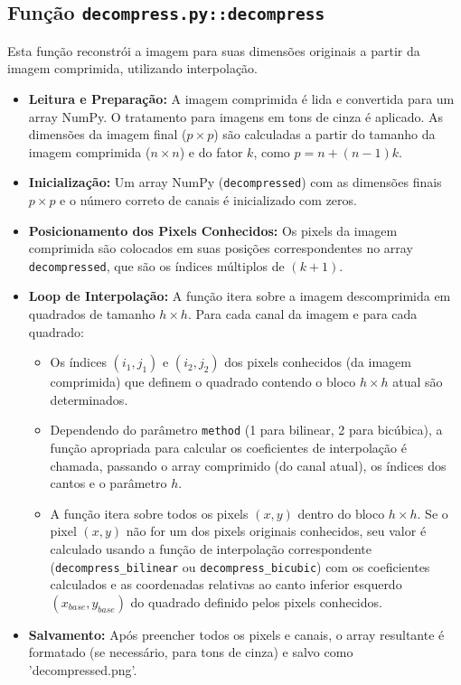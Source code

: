 \documentclass[12pt, a4paper]{article}
\begin{document}
\subsection{Função \texttt{decompress.py::decompress}}
Esta função reconstrói a imagem para suas dimensões originais a partir da imagem comprimida, utilizando interpolação.
\begin{itemize}
    \item \textbf{Leitura e Preparação:} A imagem comprimida é lida e convertida para um array NumPy. O tratamento para imagens em tons de cinza é aplicado. As dimensões da imagem final ($p \times p$) são calculadas a partir do tamanho da imagem comprimida ($n \times n$) e do fator $k$, como $p = n + (n-1)k$.
    \item \textbf{Inicialização:} Um array NumPy (\texttt{decompressed}) com as dimensões finais $p \times p$ e o número correto de canais é inicializado com zeros.
    \item \textbf{Posicionamento dos Pixels Conhecidos:} Os pixels da imagem comprimida são colocados em suas posições correspondentes no array \texttt{decompressed}, que são os índices múltiplos de $(k+1)$.
    \item \textbf{Loop de Interpolação:} A função itera sobre a imagem descomprimida em quadrados de tamanho $h \times h$. Para cada canal da imagem e para cada quadrado:
        \begin{itemize}
            \item Os índices $(i_1, j_1)$ e $(i_2, j_2)$ dos pixels conhecidos (da imagem comprimida) que definem o quadrado contendo o bloco $h \times h$ atual são determinados.
            \item Dependendo do parâmetro \texttt{method} (1 para bilinear, 2 para bicúbica), a função apropriada para calcular os coeficientes de interpolação é chamada, passando o array comprimido (do canal atual), os índices dos cantos e o parâmetro $h$.
            \item A função itera sobre todos os pixels $(x, y)$ dentro do bloco $h \times h$. Se o pixel $(x, y)$ não for um dos pixels originais conhecidos, seu valor é calculado usando a função de interpolação correspondente (\texttt{decompress\_bilinear} ou \texttt{decompress\_bicubic}) com os coeficientes calculados e as coordenadas relativas ao canto inferior esquerdo $(x_{base}, y_{base})$ do quadrado definido pelos pixels conhecidos.
        \end{itemize}
    \item \textbf{Salvamento:} Após preencher todos os pixels e canais, o array resultante é formatado (se necessário, para tons de cinza) e salvo como 'decompressed.png'.
\end{itemize}
\end{document}
